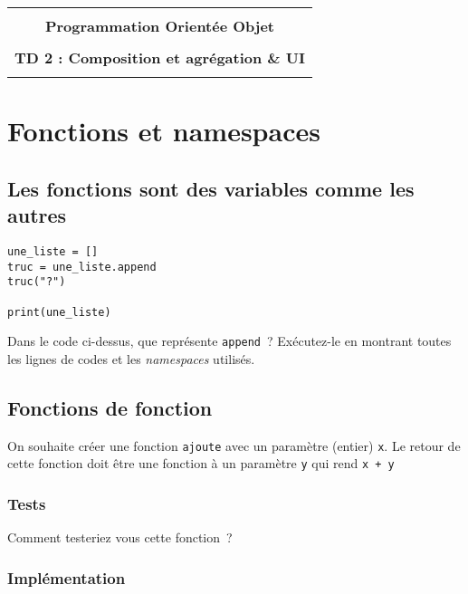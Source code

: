 \documentclass[12pt]{article}
\begin{document}
    \begin{center}
      \begin{tabular}{c}
      \hline
    \\
        {\bf \textsf {\Large Programmation Orientée Objet}}\\
    \\
        {\bf \textsf {\Large TD 2 : Composition et agrégation \& UI}}\\
    \\
        \hline
      \end{tabular}
    \end{center}
    \vspace{15mm}

\section{Fonctions et namespaces}

\subsection{Les fonctions sont des variables comme les autres}


\lstset{language=Python}
\begin{lstlisting}
une_liste = []
truc = une_liste.append
truc("?")

print(une_liste)
\end{lstlisting}




Dans le code ci-dessus, que représente \verb|append|~? Exécutez-le  en montrant toutes les lignes de codes et les {\em namespaces} utilisés.


\subsection{Fonctions de fonction}

On souhaite créer une fonction \verb|ajoute| avec un paramètre (entier) \verb|x|. Le retour de cette fonction doit être une fonction à un paramètre \verb|y| qui rend \verb|x + y|

\subsubsection{Tests}

Comment testeriez vous cette fonction~?

\subsubsection{Implémentation}
\end{document}
